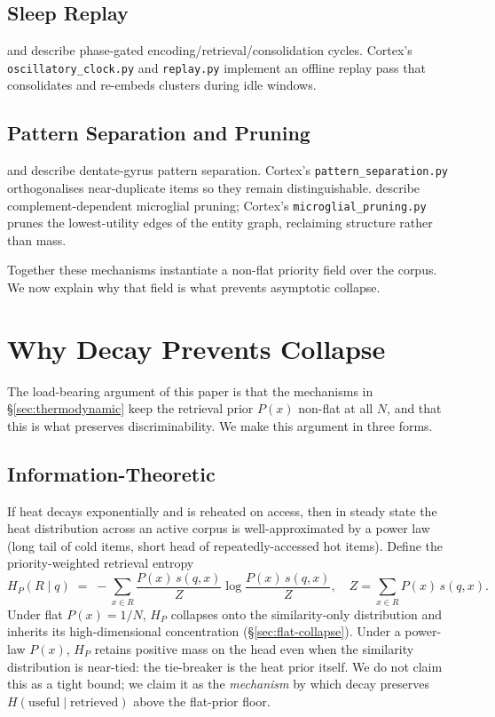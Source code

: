 \documentclass[11pt]{article}
\begin{document}
\subsection{Sleep Replay}
\label{sec:sleep}

\citet{Buzsaki2015} and \citet{Hasselmo2005} describe phase-gated
encoding/retrieval/consolidation cycles.  Cortex's
\texttt{oscillatory\_clock.py} and \texttt{replay.py} implement an
offline replay pass that consolidates and re-embeds clusters during
idle windows.

\subsection{Pattern Separation and Pruning}
\label{sec:separation}

\citet{Leutgeb2007} and \citet{Yassa2011} describe dentate-gyrus
pattern separation.  Cortex's \texttt{pattern\_separation.py}
orthogonalises near-duplicate items so they remain distinguishable.
\citet{Wang2020} describe complement-dependent microglial pruning;
Cortex's \texttt{microglial\_pruning.py} prunes the lowest-utility
edges of the entity graph, reclaiming structure rather than mass.

Together these mechanisms instantiate a non-flat priority field over
the corpus.  We now explain why that field is what prevents
asymptotic collapse.

\section{Why Decay Prevents Collapse}
\label{sec:why-decay}

The load-bearing argument of this paper is that the mechanisms in
\S\ref{sec:thermodynamic} keep the retrieval prior $P(x)$ non-flat
at all $N$, and that this is what preserves discriminability.  We
make this argument in three forms.

\subsection{Information-Theoretic}
\label{sec:info-theory}

If heat decays exponentially and is reheated on access, then in
steady state the heat distribution across an active corpus is
well-approximated by a power law (long tail of cold items, short
head of repeatedly-accessed hot items).  Define the
priority-weighted retrieval entropy
\begin{equation}
H_P(R \mid q) \;=\; -\sum_{x \in R}
\frac{P(x)\, s(q, x)}{Z}
\log \frac{P(x)\, s(q, x)}{Z},
\quad Z = \sum_{x \in R} P(x)\, s(q, x).
\label{eq:HP}
\end{equation}
Under flat $P(x) = 1/N$, $H_P$ collapses onto the similarity-only
distribution and inherits its high-dimensional concentration
(\S\ref{sec:flat-collapse}).  Under a power-law $P(x)$, $H_P$
retains positive mass on the head even when the similarity
distribution is near-tied: the tie-breaker is the heat prior itself.
We do not claim this as a tight bound; we claim it as the
\emph{mechanism} by which decay preserves
$H(\mathrm{useful} \mid \mathrm{retrieved})$ above the flat-prior
floor.
\end{document}
